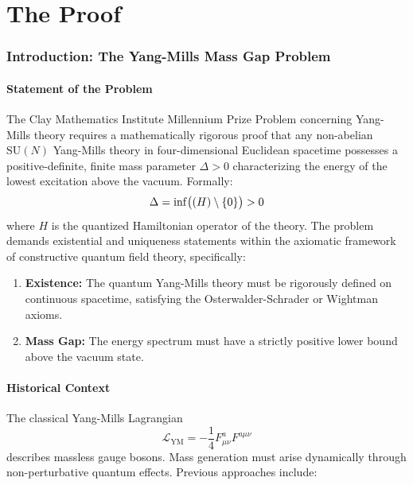 \documentclass[11pt,a4paper]{article}
\providecommand{\Lagr}{\mathcal{L}}
\let\spec\relax
\DeclareMathOperator{\spec}{spec}
\newcommand{\spec}{\mathrm{spec}}
\theoremstyle{plain}
\theoremstyle{definition}
\begin{document}
\part{The Proof}

\section{Introduction: The Yang-Mills Mass Gap Problem}
\label{sec:introduction}

\subsection{Statement of the Problem}

The Clay Mathematics Institute Millennium Prize Problem concerning Yang-Mills theory requires a mathematically rigorous proof that any non-abelian $\mathrm{SU}(N)$ Yang-Mills theory in four-dimensional Euclidean spacetime possesses a positive-definite, finite mass parameter $\Delta > 0$ characterizing the energy of the lowest excitation above the vacuum. Formally:
\begin{equation}
\Delta = \inf\bigl(\spec(H) \setminus \{0\}\bigr) > 0
\label{eq:mass_gap_def}
\end{equation}
where $H$ is the quantized Hamiltonian operator of the theory. The problem demands existential and uniqueness statements within the axiomatic framework of constructive quantum field theory, specifically:
\begin{enumerate}[label=(\roman*)]
\item \textbf{Existence:} The quantum Yang-Mills theory must be rigorously defined on continuous spacetime, satisfying the Osterwalder-Schrader or Wightman axioms.
\item \textbf{Mass Gap:} The energy spectrum must have a strictly positive lower bound above the vacuum state.
\end{enumerate}

\subsection{Historical Context}

The classical Yang-Mills Lagrangian
\begin{equation}
\Lagr_{\mathrm{YM}} = -\frac{1}{4} F^a_{\mu\nu} F^{a\mu\nu}
\label{eq:ym_classical}
\end{equation}
describes massless gauge bosons. Mass generation must arise dynamically through non-perturbative quantum effects. Previous approaches include:
\end{document}
